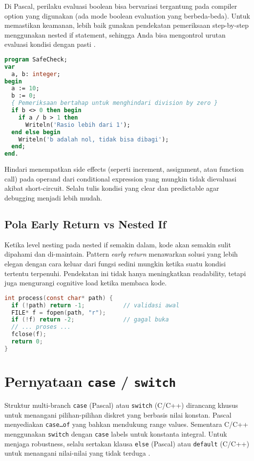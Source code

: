 \documentclass[../main.tex]{subfiles}
\begin{document}
Di Pascal, perilaku evaluasi boolean bisa bervariasi tergantung pada compiler option yang digunakan (ada mode boolean evaluation yang berbeda-beda). Untuk memastikan keamanan, lebih baik gunakan pendekatan pemeriksaan step-by-step menggunakan nested if statement, sehingga Anda bisa mengontrol urutan evaluasi kondisi dengan pasti \parencite{free-pascal-docs}.

\begin{lstlisting}[language=Pascal, caption={Pemeriksaan bertahap di Pascal}]
program SafeCheck;
var
  a, b: integer;
begin
  a := 10;
  b := 0;
  { Pemeriksaan bertahap untuk menghindari division by zero }
  if b <> 0 then begin
    if a / b > 1 then
      Writeln('Rasio lebih dari 1');
  end else begin
    Writeln('b adalah nol, tidak bisa dibagi');
  end;
end.
\end{lstlisting}

Hindari menempatkan side effects (seperti increment, assignment, atau function call) pada operand dari conditional expression yang mungkin tidak dievaluasi akibat short-circuit. Selalu tulis kondisi yang clear dan predictable agar debugging menjadi lebih mudah.

\subsection{Pola Early Return vs Nested If}
Ketika level nesting pada nested if semakin dalam, kode akan semakin sulit dipahami dan di-maintain. Pattern \emph{early return} menawarkan solusi yang lebih elegan dengan cara keluar dari fungsi sedini mungkin ketika suatu kondisi tertentu terpenuhi. Pendekatan ini tidak hanya meningkatkan readability, tetapi juga mengurangi cognitive load ketika membaca kode.
\begin{lstlisting}[language=C]
int process(const char* path) {
  if (!path) return -1;           // validasi awal
  FILE* f = fopen(path, "r");
  if (!f) return -2;              // gagal buka
  // ... proses ...
  fclose(f);
  return 0;
}
\end{lstlisting}

\section{Pernyataan \texttt{case} / \texttt{switch}}
Struktur multi-branch \texttt{case} (Pascal) atau \texttt{switch} (C/C++) dirancang khusus untuk menangani pilihan-pilihan diskret yang berbasis nilai konstan. Pascal menyediakan \texttt{case\ldots of} yang bahkan mendukung range values. Sementara C/C++ menggunakan \texttt{switch} dengan \texttt{case} labels untuk konstanta integral. Untuk menjaga robustness, selalu sertakan klausa \texttt{else} (Pascal) atau \texttt{default} (C/C++) untuk menangani nilai-nilai yang tidak terduga \parencite{pascal-tutorial-wikibooks,gnu-c-manual,cpp-reference,cpp-switch,cpp-enum-class}.
\end{document}
